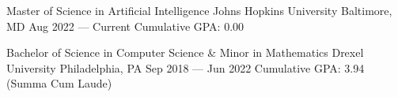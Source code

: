 
\begin{cventries}

    \vspace{1mm}
    \cventry
    {Master of Science in Artificial Intelligence} %
    {Johns Hopkins University} %
    {Baltimore, MD} %
    {Aug 2022 --- Current} %
    {Cumulative GPA: 0.00}
    
    \cventry
    {Bachelor of Science in Computer Science \& Minor in Mathematics} %
    {Drexel University} %
    {Philadelphia, PA} %
    {Sep 2018 --- Jun 2022} %
    {Cumulative GPA: 3.94 (Summa Cum Laude)}
    \vspace{-1mm}

\end{cventries}
